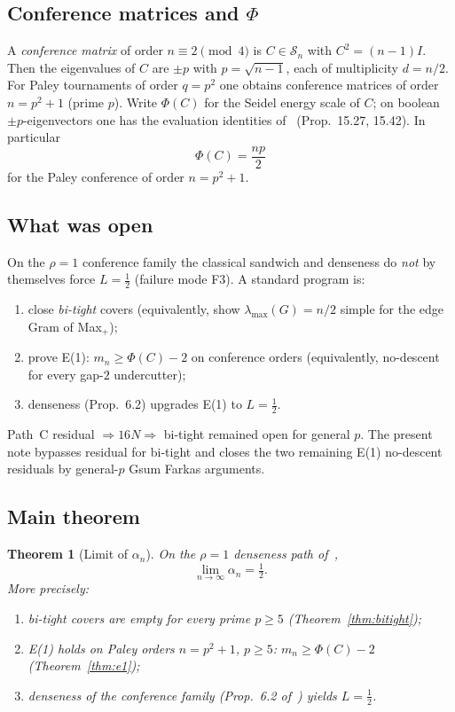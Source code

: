 \documentclass[11pt,a4paper]{article}
\theoremstyle{plain}
\newtheorem{theorem}{Theorem}[section]
\theoremstyle{definition}
\newcommand{\phic}{\Phi(C)}
\begin{document}
\subsection{Conference matrices and $\Phi$}

A \emph{conference matrix} of order $n\equiv2\pmod4$ is $C\in\mathcal{S}_n$ with
$C^2=(n-1)I$. Then the eigenvalues of $C$ are $\pm p$ with $p=\sqrt{n-1}$, each of
multiplicity $d=n/2$.
For Paley tournaments of order $q=p^2$ one obtains conference matrices of order
$n=p^2+1$ (prime $p$).
Write $\phic$ for the Seidel energy scale of $C$; on boolean $\pm p$-eigenvectors one has
the evaluation identities of~\cite{solution-repo} (Prop.\ 15.27, 15.42).
In particular
\[
\Phi(C)=\frac{np}{2}
\]
for the Paley conference of order $n=p^2+1$.

\subsection{What was open}

On the $\rho=1$ conference family the classical sandwich and denseness do \emph{not} by
themselves force $L=\tfrac12$ (failure mode F3).
A standard program is:
\begin{enumerate}[label=(\roman*)]
\item close \emph{bi-tight} covers (equivalently, show $\lambda_{\max}(G)=n/2$ simple for the
  edge Gram of Max$_+$);
\item prove E(1): $m_n\ge\Phi(C)-2$ on conference orders (equivalently, no-descent for every
  gap-$2$ undercutter);
\item denseness (Prop.\ 6.2) upgrades E(1) to $L=\tfrac12$.
\end{enumerate}
Path~C residual $\Rightarrow 16N\Rightarrow$ bi-tight remained open for general $p$.
The present note bypasses residual for bi-tight and closes the two remaining E(1) no-descent
residuals by general-$p$ Gsum Farkas arguments.

\subsection{Main theorem}

\begin{theorem}[Limit of $\alpha_n$]
\label{thm:main}
On the $\rho=1$ denseness path of~\cite{MO413935,solution-repo},
\[
\lim_{n\to\infty}\alpha_n=\tfrac12.
\]
More precisely:
\begin{enumerate}[label=(\alph*)]
\item bi-tight covers are empty for every prime $p\ge5$ (Theorem~\ref{thm:bitight});
\item E(1) holds on Paley orders $n=p^2+1$, $p\ge5$: $m_n\ge\Phi(C)-2$
  (Theorem~\ref{thm:e1});
\item denseness of the conference family (Prop.\ 6.2 of~\cite{solution-repo}) yields
  $L=\tfrac12$.
\end{enumerate}
\end{theorem}
\end{document}
